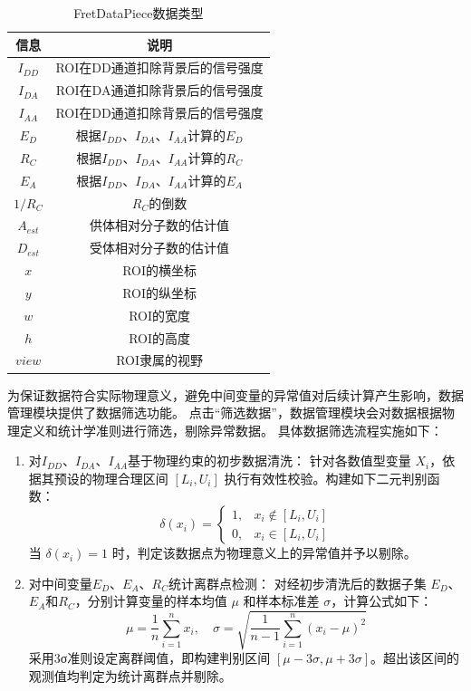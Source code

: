 \begin{table}[htbp]
  \centering
  \caption{FretDataPiece数据类型}
  \label{tab:数据项内容定义}
    \begin{tabular}{cc}
      \toprule[1.5pt]
      {信息} & {说明} \\
      \midrule
      $I_{DD}$ & ROI在DD通道扣除背景后的信号强度 \\
      $I_{DA}$ & ROI在DA通道扣除背景后的信号强度 \\
      $I_{AA}$ & ROI在DD通道扣除背景后的信号强度 \\
      $E_D$ & 根据$I_{DD}$、$I_{DA}$、$I_{AA}$计算的$E_D$ \\
      $R_C$ & 根据$I_{DD}$、$I_{DA}$、$I_{AA}$计算的$R_C$ \\
      $E_A$ & 根据$I_{DD}$、$I_{DA}$、$I_{AA}$计算的$E_A$ \\
      $1/R_C$ & $R_C$的倒数 \\
      $A_{est}$ & 供体相对分子数的估计值 \\
      $D_{est}$ & 受体相对分子数的估计值 \\
      $x$ & ROI的横坐标 \\
      $y$ & ROI的纵坐标 \\
      $w$ & ROI的宽度 \\
      $h$ & ROI的高度 \\
      $view$ & ROI隶属的视野\\
      \bottomrule[1.5pt]
    \end{tabular}
\end{table}

为保证数据符合实际物理意义，避免中间变量的异常值对后续计算产生影响，数据管理模块提供了数据筛选功能。
点击“筛选数据”，数据管理模块会对数据根据物理定义和统计学准则进行筛选，剔除异常数据。
具体数据筛选流程实施如下：
\begin{enumerate}
  \item 对$I_{DD}$、$I_{DA}$、$I_{AA}$基于物理约束的初步数据清洗：
    针对各数值型变量 \( X_i \)，依据其预设的物理合理区间 \( [L_i, U_i] \) 执行有效性校验。构建如下二元判别函数：
    \begin{equation}
      \delta(x_i) = 
      \begin{cases} 
        1, & x_i \notin [L_i, U_i] \\
        0, & x_i \in [L_i, U_i]
      \end{cases}
    \end{equation}
    当 \( \delta(x_i) = 1 \) 时，判定该数据点为物理意义上的异常值并予以剔除。
  \item 对中间变量$E_D$、$E_A$、$R_C$统计离群点检测：
    对经初步清洗后的数据子集 \( E_D \)、\( E_A \)和$R_C$，分别计算变量的样本均值 \( \mu \) 和样本标准差 \( \sigma \)，计算公式如下：
    \begin{equation}
      \mu = \frac{1}{n}\sum_{i=1}^n x_i, \quad \sigma = \sqrt{\frac{1}{n - 1}\sum_{i=1}^n (x_i - \mu)^2}
    \end{equation}
    采用3σ准则设定离群阈值，即构建判别区间 \( [\mu - 3\sigma, \mu + 3\sigma] \)。超出该区间的观测值均判定为统计离群点并剔除。
\end{enumerate}

